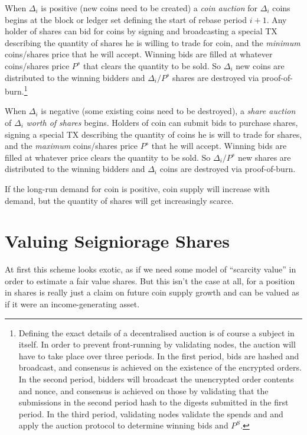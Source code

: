 \documentclass[twocolumn]{article}
\begin{document}
When $\Delta_{i}$ is positive (new coins need to be created) a
\emph{coin auction} for $\Delta_{i}$ coins begins at the block or
ledger set defining the start of rebase period $i+1$. Any holder of
shares can bid for coins by signing and broadcasting a special TX
describing the quantity of shares he is willing to trade for coin, and
the \emph{minimum} coins/shares price that he will accept. Winning
bids are filled at whatever coins/shares price $P^{s}$ that clears the
quantity to be sold. So $\Delta_{i}$ new coins are distributed to the
winning bidders and $\Delta_{i}/P^{s}$ shares are destroyed via
proof-of-burn.\footnote{Defining the exact details of a decentralised
  auction is of course a subject in itself. In order to prevent
  front-running by validating nodes, the auction will have to take
  place over three periods. In the first period, bids are hashed and
  broadcast, and consensus is achieved on the existence of the
  encrypted orders. In the second period, bidders will broadcast the
  unencrypted order contents and nonce, and consensus is achieved on
  those by validating that the submissions in the second period hash
  to the digests submitted in the first period. In the third period,
  validating nodes validate the spends and and apply the auction
  protocol to determine winning bids and $P^{S}$.}

When $\Delta_{i}$ is negative (some existing coins need to be
destroyed), a \emph{share auction} of $\Delta_{i}$ \emph{worth of
  shares} begins. Holders of coin can submit bids to purchase shares,
signing a special TX describing the quantity of coins he is will to
trade for shares, and the \emph{maximum} coins/shares price $P^{s}$
that he will accept. Winning bids are filled at whatever price clears
the quantity to be sold. So $\Delta_{i}/P^{s}$ new shares are
distributed to the winning bidders and $\Delta_{i}$ coins are
destroyed via proof-of-burn.

If the long-run demand for coin is positive, coin supply will increase
with demand, but the quantity of shares will get increasingly
scarce.

\section*{Valuing Seigniorage Shares}
At first this scheme looks exotic, as if we need some model of
``scarcity value'' in order to estimate a fair value shares. But this
isn't the case at all, for a position in shares is really just a claim
on future coin supply growth and can be valued as if it were an
income-generating asset.
\end{document}
